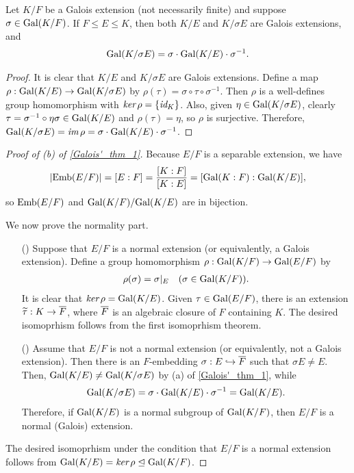 \begin{prop}
    Let $K/F$ be a Galois extension (not necessarily finite) and suppose $\sigma\in{\textrm{Gal}({K/F})}$.
    If $F\leq E\leq K$, then both $K/E$ and $K/\sigma E$ are Galois extensions, and
    \begin{align*}
        {\textrm{Gal}({K/\sigma E})}=\sigma\cdot{\textrm{Gal}({K/E})}\cdot\sigma^{-1}.
    \end{align*}
\end{prop}
\begin{proof}
    It is clear that $K/E$ and $K/\sigma E$ are Galois extensions.
    Define a map $\rho: {\textrm{Gal}({K/E})}\rightarrow{\textrm{Gal}({K/\sigma E})}$ by $\rho(\tau)=\sigma\circ\tau\circ\sigma^{-1}$.
    Then $\rho$ is a well-defines group homomorphism with $\textit{ker\,}\rho=\{\textit{id}_{K}\}$.
    Also, given $\eta\in{\textrm{Gal}({K/\sigma E})}$, clearly $\tau=\sigma^{-1}\circ\eta\sigma\in{\textrm{Gal}({K/E})}$ and $\rho(\tau)=\eta$, so $\rho$ is surjective.
    Therefore, ${\textrm{Gal}({K/\sigma E})}=\textit{im\,}\rho=\sigma\cdot{\textrm{Gal}({K/E})}\cdot\sigma^{-1}$.
\end{proof}
\begin{proof}[Proof of (b) of \cref{Galois'_thm_1}]
    Because $E/F$ is a separable extension, we have
    \begin{align*}
        |{\textrm{Emb}({E/F})}|=[E:F]=\frac{[K:F]}{[K:E]}=[{\textrm{Gal}({K:F})}: {\textrm{Gal}({K/E})}],
    \end{align*}
    so ${\textrm{Emb}({E/F})}$ and ${\textrm{Gal}({K/F})}/{\textrm{Gal}({K/E})}$ are in bijection.

    We now prove the normality part.
    \begin{enumerate}
        \item[(\romannumeral 1)]
        {
            Suppose that $E/F$ is a normal extension (or equivalently, a Galois extension).
            Define a group homomorphism $\rho: {\textrm{Gal}({K/F})}\rightarrow{\textrm{Gal}({E/F})}$ by
            \begin{align*}
                \rho(\sigma)=\sigma|_E\quad(\sigma\in{\textrm{Gal}({K/F})}).
            \end{align*}
            It is clear that $\textit{ker\,}\rho={\textrm{Gal}({K/E})}$.
            Given $\tau\in{\textrm{Gal}({E/F})}$, there is an extension $\widetilde\tau: K\rightarrow\overline{F}$, where $\overline{F}$ is an algebraic closure of $F$ containing $K$.
            The desired isomoprhism follows from the first isomoprhism theorem.
        }
        \item[(\romannumeral 2)]
        {
            Assume that $E/F$ is not a normal extension (or equivalently, not a Galois extension).
            Then there is an $F$-embedding $\sigma: E\hookrightarrow\overline{F}$ such that $\sigma E\neq E$.
            Then, ${\textrm{Gal}({K/E})}\neq{\textrm{Gal}({K/\sigma E})}$ by (a) of \cref{Galois'_thm_1}, while
            \begin{align*}
                {\textrm{Gal}({K/\sigma E})}=\sigma\cdot{\textrm{Gal}({K/E})}\cdot\sigma^{-1}={\textrm{Gal}({K/E})}.
            \end{align*}
            Therefore, if ${\textrm{Gal}({K/E})}$ is a normal subgroup of ${\textrm{Gal}({K/F})}$, then $E/F$ is a normal (Galois) extension.
        }
    \end{enumerate}
    The desired isomoprhism under the condition that $E/F$ is a normal extension follows from ${\textrm{Gal}({K/E})}=\textit{ker\,}\rho\trianglelefteq{\textrm{Gal}({K/F})}$.
\end{proof}

